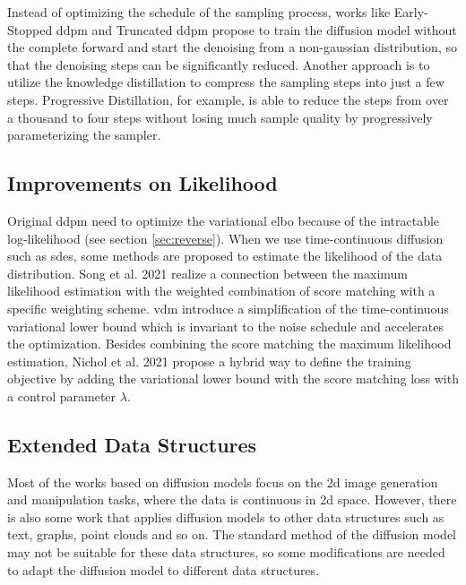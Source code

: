 \documentclass[12pt,DIV14,BCOR12mm,a4paper,footinclude=false,headinclude,parskip=half-,twoside,openright,cleardoublepage=empty,toc=index,bibliography=totoc,listof=totoc]{scrreprt}
\numberwithin{equation}{chapter}
\begin{document}
Instead of optimizing the schedule of the sampling process, works like Early-Stopped \gls{ddpm} \cite{lyu2022conditional} and Truncated \gls{ddpm} \cite{zheng2023truncated} propose to train the diffusion model without the complete forward and start the denoising from a non-gaussian distribution, so that the denoising steps can be significantly reduced. Another approach is to utilize the knowledge distillation \cite{salimans2022progressive,meng2023distillation} to compress the sampling steps into just a few steps. Progressive Distillation, for example, is able to reduce the steps from over a thousand to four steps without losing much sample quality by progressively parameterizing the sampler.
\subsection{Improvements on Likelihood}
Original \gls{ddpm} need to optimize the variational \gls{elbo} because of the intractable log-likelihood (see section \ref{sec:reverse}). When we use time-continuous diffusion such as \glspl{sde}, some methods are proposed to estimate the likelihood of the data distribution. Song et al. 2021 \cite{song2021maximum} realize a connection between the maximum likelihood estimation with the weighted combination of score matching with a specific weighting scheme. \gls{vdm} \cite{kingma2023variational} introduce a simplification of the time-continuous variational lower bound which is invariant to the noise schedule and accelerates the optimization. Besides combining the score matching the maximum likelihood estimation, Nichol et al. 2021 \cite{nichol2021improved} propose a hybrid way to define the training objective by adding the variational lower bound with the score matching loss with a control parameter $\lambda$.

\subsection{Extended Data Structures}
Most of the works based on diffusion models focus on the \gls{2d} image generation and manipulation tasks, where the data is continuous in \gls{2d} space. However, there is also some work that applies diffusion models to other data structures such as text, graphs, point clouds and so on. The standard method of the diffusion model may not be suitable for these data structures, so some modifications are needed to adapt the diffusion model to different data structures.
\end{document}
